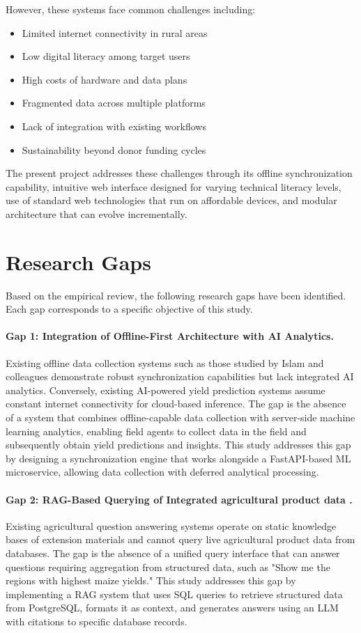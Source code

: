 However, these systems face common challenges including:
\begin{itemize}
  \item Limited internet connectivity in rural areas
  \item Low digital literacy among target users
  \item High costs of hardware and data plans
  \item Fragmented data across multiple platforms
  \item Lack of integration with existing workflows
  \item Sustainability beyond donor funding cycles
\end{itemize}

The present project addresses these challenges through its offline synchronization capability, intuitive web interface designed for varying technical literacy levels, use of standard web technologies that run on affordable devices, and modular architecture that can evolve incrementally.

\section{Research Gaps}

Based on the empirical review, the following research gaps have been identified. Each gap corresponds to a specific objective of this study.

\paragraph{Gap 1: Integration of Offline-First Architecture with AI Analytics.}
Existing offline data collection systems such as those studied by Islam and colleagues \cite{islam2021} demonstrate robust synchronization capabilities but lack integrated AI analytics. Conversely, existing AI-powered yield prediction systems assume constant internet connectivity for cloud-based inference. The gap is the absence of a system that combines offline-capable data collection with server-side machine learning analytics, enabling field agents to collect data in the field and subsequently obtain yield predictions and insights. This study addresses this gap by designing a synchronization engine that works alongside a FastAPI-based ML microservice, allowing data collection with deferred analytical processing.

\paragraph{Gap 2: RAG-Based Querying of Integrated agricultural product data .}
Existing agricultural question answering systems operate on static knowledge bases of extension materials and cannot query live agricultural product data from databases. The gap is the absence of a unified query interface that can answer questions requiring aggregation from structured data, such as "Show me the regions with highest maize yields." This study addresses this gap by implementing a RAG system that uses SQL queries to retrieve structured data from PostgreSQL, formats it as context, and generates answers using an LLM with citations to specific database records.

